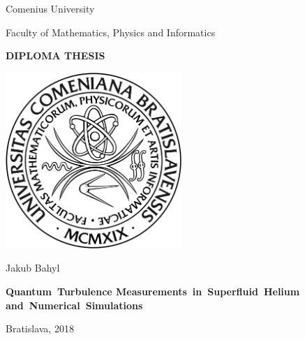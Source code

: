 \begin{center}
	\Large\sf
	Comenius University
	
	Faculty of Mathematics, Physics and Informatics
	\bigskip
	
	{
		\Huge \bfseries \sffamily DIPLOMA THESIS
	}
	
	\vfill
	
	\includegraphics[width=0.5\textwidth]{graphics/fmfi_logo.jpg} 
	
	\vfill
	
	{
		\Huge\sf Jakub Bahyl
	}
	
	\vfill
	
	{
		\Huge \bfseries \sffamily
		\mbox{Quantum Turbulence}
		\mbox{Measurements in Superfluid Helium}
		\mbox{and Numerical Simulations}
	}
	
	\vfill

	\Large\sf
	Bratislava, 2018

\end{center}

\newpage